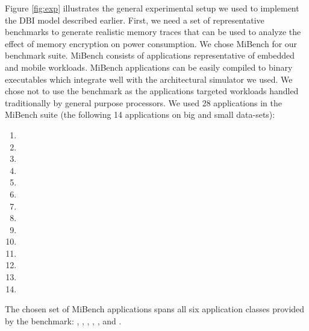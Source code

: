 Figure \ref{fig:exp} illustrates the general experimental setup we used to
implement the DBI model described earlier. First, we need a set of
representative benchmarks to generate realistic memory traces that can be used
to analyze the effect of memory encryption on power consumption. We chose
MiBench \cite{mibench} for our benchmark suite. MiBench consists of
applications representative of embedded and mobile workloads. MiBench
applications can be easily compiled to binary executables which integrate well
with the  architectural simulator we used. We chose not to use the
 benchmark as the applications targeted workloads handled
traditionally by general purpose processors. We used 28 applications in the
MiBench suite (the following 14 applications on big and small data-sets):

\begin{multicols}{2}
  \centering
  \begin{enumerate}
    \item {}
    \item {}
    \item {}
    \item {}
    \item {}
    \item {}
    \item {}
    \item {}
    \item {}
    \item {}
    \item {}
    \item {}
    \item {}
    \item {}
  \end{enumerate}
\end{multicols}

The chosen set of MiBench applications spans all six application classes
provided by the benchmark: , , ,
, , and .

